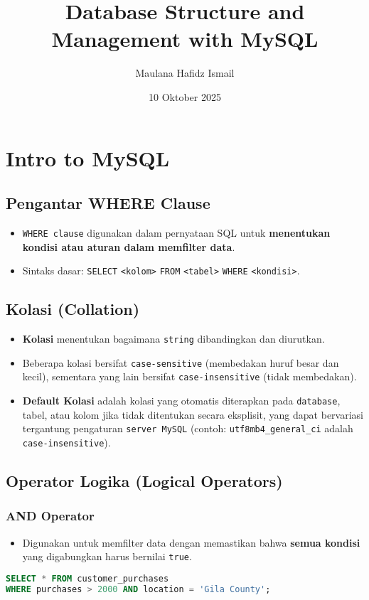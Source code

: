 \documentclass{article}
\title{Database Structure and Management with MySQL}
\date{10 Oktober 2025}
\author{Maulana Hafidz Ismail}
\begin{document}
\maketitle
\newpage

\tableofcontents
\newpage
{}

\section{Intro to MySQL}
\subsection{Pengantar WHERE Clause}
\begin{itemize}
    \item \texttt{WHERE clause} digunakan dalam pernyataan SQL untuk \textbf{menentukan kondisi atau aturan dalam memfilter data}.
    \item Sintaks dasar: \texttt{SELECT} \texttt{<kolom>} \texttt{FROM} \texttt{<tabel>} \texttt{WHERE} \texttt{<kondisi>}.
\end{itemize}

\subsection{Kolasi (Collation)}
\begin{itemize}
    \item \textbf{Kolasi} menentukan bagaimana \texttt{string} dibandingkan dan diurutkan.
    \item Beberapa kolasi bersifat \texttt{case-sensitive} (membedakan huruf besar dan kecil), sementara yang lain bersifat \texttt{case-insensitive} (tidak membedakan).
    \item \textbf{Default Kolasi} adalah kolasi yang otomatis diterapkan pada \texttt{database}, tabel, atau kolom jika tidak ditentukan secara eksplisit, yang dapat bervariasi tergantung pengaturan \texttt{server MySQL} (contoh: \texttt{utf8mb4\_general\_ci} adalah \texttt{case-insensitive}).
\end{itemize}

\subsection{Operator Logika (Logical Operators)}

\subsubsection{AND Operator}
\begin{itemize}
    \item Digunakan untuk memfilter data dengan memastikan bahwa \textbf{semua kondisi} yang digabungkan harus bernilai \texttt{true}.
\end{itemize}
\begin{lstlisting}[language=SQL, caption={Contoh Penggunaan AND}, captionpos=b]
SELECT * FROM customer_purchases
WHERE purchases > 2000 AND location = 'Gila County';
\end{lstlisting}
\end{document}
